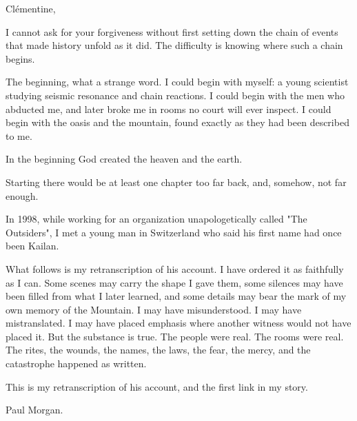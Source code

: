 \typeprologue

Clémentine,\par

I cannot ask for your forgiveness without first setting down the chain of events that made history unfold as it did. 
The difficulty is knowing where such a chain begins.\par

The beginning, what a strange word. 
I could begin with myself: a young scientist studying seismic resonance and chain reactions. 
I could begin with the men who abducted me, and later broke me in rooms no court will ever inspect. 
I could begin with the oasis and the mountain, found exactly as they had been described to me.\par

\begin{scripture}
In the beginning God created the heaven and the earth.
\end{scripture}

Starting there would be at least one chapter too far back, and, somehow, not far enough.\par

In 1998, while working for an organization unapologetically called "The Outsiders", I met a young man in Switzerland who said his first name had once been Kailan.\par

What follows is my retranscription of his account. 
I have ordered it as faithfully as I can. 
Some scenes may carry the shape I gave them, some silences may have been filled from what I later learned, and some details may bear the mark of my own memory of the Mountain. 
I may have misunderstood. I may have mistranslated. 
I may have placed emphasis where another witness would not have placed it. 
But the substance is true. The people were real. The rooms were real.
The rites, the wounds, the names, the laws, the fear, the mercy, and the catastrophe happened as written.\par

This is my retranscription of his account, and the first link in my story.\par

Paul Morgan.\par

\ornament